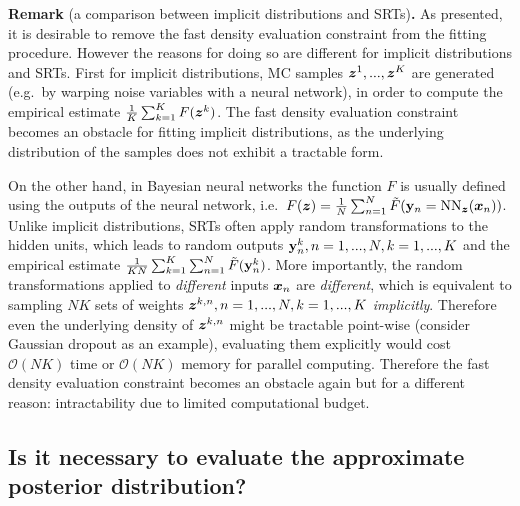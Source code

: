 \vspace{1em}
\begin{tcolorbox}
\textbf{Remark} (a comparison between implicit distributions and SRTs)\textbf{.}
As presented, it is desirable to remove the fast density evaluation constraint from the fitting procedure. However the reasons for doing so are different for implicit distributions and SRTs. First for implicit distributions, MC samples $\bm{z}^1, ..., \bm{z}^K$ are generated (e.g.~by warping noise variables with a neural network), in order to compute the empirical estimate $\frac{1}{K} \sum_{k=1}^K F(\bm{z}^k)$. The fast density evaluation constraint becomes an obstacle for fitting implicit distributions, as the underlying distribution of the samples does not exhibit a tractable form. 

On the other hand, in Bayesian neural networks the function $F$ is usually defined using the outputs of the neural network, i.e.~$F(\bm{z}) = \frac{1}{N} \sum_{n=1}^N \tilde{F}(\mathbf{y}_n = \text{NN}_{\bm{z}}(\bm{x}_n))$. Unlike implicit distributions, SRTs often apply random transformations to the hidden units, which leads to random outputs $\mathbf{y}_n^k, n=1, ..., N, k=1, ..., K$ and the empirical estimate $\frac{1}{KN} \sum_{k=1}^K \sum_{n=1}^N \tilde{F}(\mathbf{y}_n^k)$. More importantly, the random transformations applied to \emph{different} inputs $\bm{x}_n$ are \emph{different}, which is equivalent to sampling $NK$ sets of weights $\bm{z}^{k, n}, n=1, ..., N, k=1, ..., K$ \emph{implicitly}. 
%
Therefore even the underlying density of $\bm{z}^{k, n}$ might be tractable point-wise (consider Gaussian dropout \citep{srivastava:dropout2014, kingma:variational_dropout2015} as an example), evaluating them explicitly would cost $\mathcal{O}(NK)$ time or $\mathcal{O}(NK)$ memory for parallel computing. Therefore the fast density evaluation constraint becomes an obstacle again but for a different reason: intractability due to limited computational budget.
\end{tcolorbox}

\subsection{Is it necessary to evaluate the approximate posterior distribution?}


